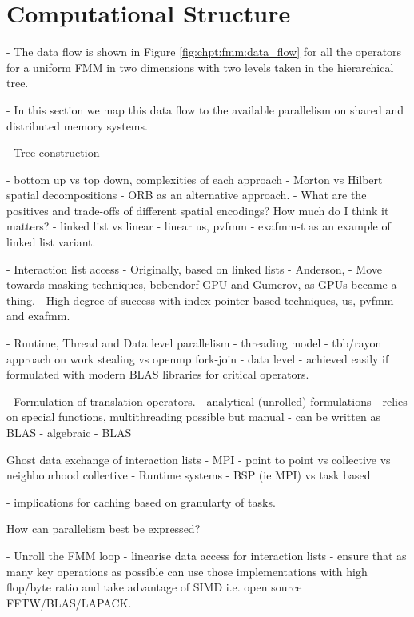 \section{Computational Structure}\label{chpt:fmm:sec:computational_structure}

- The data flow is shown in Figure \ref{fig:chpt:fmm:data_flow} for all the operators for a uniform FMM in two dimensions with two levels taken in the hierarchical tree.

- In this section we map this data flow to the available parallelism on shared and distributed memory systems.

- Tree construction

    - bottom up vs top down, complexities of each approach
    - Morton vs Hilbert spatial decompositions
    - ORB as an alternative approach.
    - What are the positives and trade-offs of different spatial encodings? How much do I think it matters?
    - linked list vs linear
        - linear us, pvfmm
        - exafmm-t as an example of linked list variant.

- Interaction list access
    - Originally, based on linked lists - Anderson,
    - Move towards masking techniques, bebendorf GPU and Gumerov, as GPUs became a thing.
    - High degree of success with index pointer based techniques, us, pvfmm and exafmm.

- Runtime, Thread and Data level parallelism
    - threading model
        - tbb/rayon approach on work stealing vs openmp fork-join
    - data level
        - achieved easily if formulated with modern BLAS libraries for critical operators.

- Formulation of translation operators.
    - analytical (unrolled) formulations
        - relies on special functions, multithreading possible but manual
        - can be written as BLAS
    - algebraic
        - BLAS

Ghost data exchange of interaction lists
    - MPI
        - point to point vs collective vs neighbourhood collective
    - Runtime systems
        - BSP (ie MPI) vs task based

    - implications for caching based on granularty of tasks.

How can parallelism best be expressed?

- Unroll the FMM loop
- linearise data access for interaction lists
- ensure that as many key operations as possible can use those implementations with high flop/byte ratio and take advantage of SIMD i.e. open source FFTW/BLAS/LAPACK.


